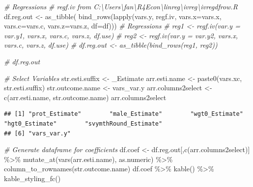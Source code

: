\documentclass[
]{book}
\newenvironment{Shaded}{\begin{snugshade}}{\end{snugshade}}
\newcommand{\AttributeTok}[1]{\textcolor[rgb]{0.77,0.63,0.00}{#1}}
\newcommand{\CommentTok}[1]{\textcolor[rgb]{0.56,0.35,0.01}{\textit{#1}}}
\newcommand{\FunctionTok}[1]{\textcolor[rgb]{0.00,0.00,0.00}{#1}}
\newcommand{\NormalTok}[1]{#1}
\newcommand{\OtherTok}[1]{\textcolor[rgb]{0.56,0.35,0.01}{#1}}
\newcommand{\SpecialCharTok}[1]{\textcolor[rgb]{0.00,0.00,0.00}{#1}}
\newcommand{\StringTok}[1]{\textcolor[rgb]{0.31,0.60,0.02}{#1}}
\begin{document}
\begin{Shaded}
\begin{Highlighting}[]
\CommentTok{\# Regressions}
\CommentTok{\# regf.iv from C:\textbackslash{}Users\textbackslash{}fan\textbackslash{}R4Econ\textbackslash{}linreg\textbackslash{}ivreg\textbackslash{}ivregdfrow.R}
\NormalTok{df.reg.out }\OtherTok{\textless{}{-}} \FunctionTok{as\_tibble}\NormalTok{(}
  \FunctionTok{bind\_rows}\NormalTok{(}\FunctionTok{lapply}\NormalTok{(vars.y, regf.iv,}
                   \AttributeTok{vars.x=}\NormalTok{vars.x, }\AttributeTok{vars.c=}\NormalTok{vars.c, }\AttributeTok{vars.z=}\NormalTok{vars.z, }\AttributeTok{df=}\NormalTok{df)))}
\CommentTok{\# Regressions}
\CommentTok{\# reg1 \textless{}{-} regf.iv(var.y = var.y1, vars.x, vars.c, vars.z, df.use)}
\CommentTok{\# reg2 \textless{}{-} regf.iv(var.y = var.y2, vars.x, vars.c, vars.z, df.use)}
\CommentTok{\# df.reg.out \textless{}{-} as\_tibble(bind\_rows(reg1, reg2))}
\end{Highlighting}
\end{Shaded}

\begin{Shaded}
\begin{Highlighting}[]
\CommentTok{\# df.reg.out}
\end{Highlighting}
\end{Shaded}

\begin{Shaded}
\begin{Highlighting}[]
\CommentTok{\# Select Variables}
\NormalTok{str.esti.suffix }\OtherTok{\textless{}{-}} \StringTok{\textquotesingle{}\_Estimate\textquotesingle{}}
\NormalTok{arr.esti.name }\OtherTok{\textless{}{-}} \FunctionTok{paste0}\NormalTok{(vars.xc, str.esti.suffix)}
\NormalTok{str.outcome.name }\OtherTok{\textless{}{-}} \StringTok{\textquotesingle{}vars\_var.y\textquotesingle{}}
\NormalTok{arr.columns2select }\OtherTok{\textless{}{-}} \FunctionTok{c}\NormalTok{(arr.esti.name, str.outcome.name)}
\NormalTok{arr.columns2select}
\end{Highlighting}
\end{Shaded}

\begin{verbatim}
## [1] "prot_Estimate"        "male_Estimate"        "wgt0_Estimate"        "hgt0_Estimate"        "svymthRound_Estimate"
## [6] "vars_var.y"
\end{verbatim}

\begin{Shaded}
\begin{Highlighting}[]
\CommentTok{\# Generate dataframe for coefficients}
\NormalTok{df.coef }\OtherTok{\textless{}{-}}\NormalTok{ df.reg.out[,}\FunctionTok{c}\NormalTok{(arr.columns2select)] }\SpecialCharTok{\%\textgreater{}\%}
  \FunctionTok{mutate\_at}\NormalTok{(}\FunctionTok{vars}\NormalTok{(arr.esti.name), as.numeric) }\SpecialCharTok{\%\textgreater{}\%} \FunctionTok{column\_to\_rownames}\NormalTok{(str.outcome.name)}
\NormalTok{df.coef }\SpecialCharTok{\%\textgreater{}\%}
  \FunctionTok{kable}\NormalTok{() }\SpecialCharTok{\%\textgreater{}\%}
  \FunctionTok{kable\_styling\_fc}\NormalTok{()}
\end{Highlighting}
\end{Shaded}
\end{document}
